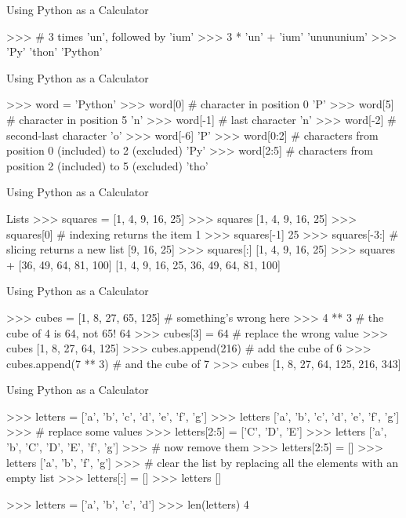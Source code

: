 \documentclass[11pt]{beamer}
\begin{document}
\begin{frame}[containsverbatim]{Using Python as a Calculator}
\begin{python}
>>> # 3 times 'un', followed by 'ium'
>>> 3 * 'un' + 'ium'
'unununium'
>>> 'Py' 'thon'
'Python'
\end{python}
\end{frame}


\begin{frame}[containsverbatim]{Using Python as a Calculator}
\begin{python}
>>> word = 'Python'
>>> word[0]  # character in position 0
'P'
>>> word[5]  # character in position 5
'n'
>>> word[-1]  # last character
'n'
>>> word[-2]  # second-last character
'o'
>>> word[-6]
'P'
>>> word[0:2]  # characters from position 0 (included) to 2 (excluded)
'Py'
>>> word[2:5]  # characters from position 2 (included) to 5 (excluded)
'tho'
\end{python}
\end{frame}


\begin{frame}[containsverbatim]{Using Python as a Calculator}
\begin{python}
Lists
>>> squares = [1, 4, 9, 16, 25]
>>> squares
[1, 4, 9, 16, 25]
>>> squares[0]  # indexing returns the item
1
>>> squares[-1]
25
>>> squares[-3:]  # slicing returns a new list
[9, 16, 25]
>>> squares[:]
[1, 4, 9, 16, 25]
>>> squares + [36, 49, 64, 81, 100]
[1, 4, 9, 16, 25, 36, 49, 64, 81, 100]
\end{python}
\end{frame}


\begin{frame}[containsverbatim]{Using Python as a Calculator}
\begin{python}
>>> cubes = [1, 8, 27, 65, 125]  # something's wrong here
>>> 4 ** 3  # the cube of 4 is 64, not 65!
64
>>> cubes[3] = 64  # replace the wrong value
>>> cubes
[1, 8, 27, 64, 125]
>>> cubes.append(216)  # add the cube of 6
>>> cubes.append(7 ** 3)  # and the cube of 7
>>> cubes
[1, 8, 27, 64, 125, 216, 343]
\end{python}
\end{frame}


\begin{frame}[containsverbatim]{Using Python as a Calculator}
\begin{python}
>>> letters = ['a', 'b', 'c', 'd', 'e', 'f', 'g']
>>> letters
['a', 'b', 'c', 'd', 'e', 'f', 'g']
>>> # replace some values
>>> letters[2:5] = ['C', 'D', 'E']
>>> letters
['a', 'b', 'C', 'D', 'E', 'f', 'g']
>>> # now remove them
>>> letters[2:5] = []
>>> letters
['a', 'b', 'f', 'g']
>>> # clear the list by replacing all the elements with an empty list
>>> letters[:] = []
>>> letters
[]
\end{python}
\end{frame}
>>> letters = ['a', 'b', 'c', 'd']
>>> len(letters)
4
\end{document}
